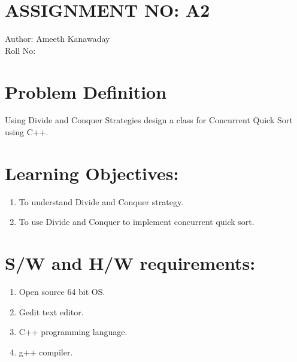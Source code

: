 \documentclass[10pt,a4paper]{article}
\begin{document}
\section{ASSIGNMENT NO: A2}
Author:\:   Ameeth Kanawaday\\
Roll No:\\
\section{Problem Definition}
Using Divide and Conquer Strategies design a class for Concurrent Quick Sort using C++.


\section{Learning Objectives:}
\begin{enumerate}
\item To understand Divide and Conquer strategy.
\item To use Divide and Conquer to implement concurrent quick sort.
\end{enumerate}

\section{S/W and H/W requirements:}
\begin{enumerate}
\item Open source 64 bit OS.
\item Gedit text editor.
\item C++ programming language.
\item g++ compiler.
\end{enumerate}
\end{document}
